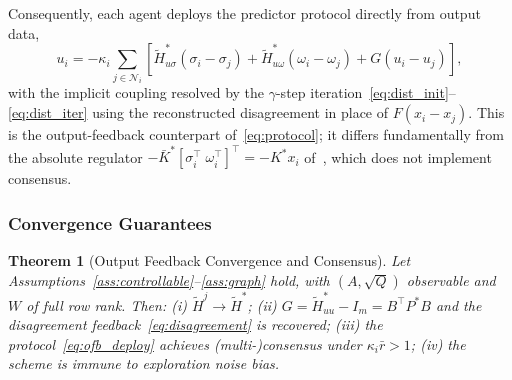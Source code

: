 \documentclass[12pt]{elsarticle}
\newtheorem{theorem}{Theorem}
\theoremstyle{remark}
\begin{document}
Consequently, each agent deploys the predictor protocol directly from output data,
\begin{equation}
u_i = -\kappa_i \sum_{j \in \mathcal{N}_i} \left[ \tilde{H}_{u\sigma}^*(\sigma_i - \sigma_j) + \tilde{H}_{u\omega}^*(\omega_i - \omega_j) + G(u_i - u_j) \right],
\label{eq:ofb_deploy}
\end{equation}
with the implicit coupling resolved by the $\gamma$-step iteration~\eqref{eq:dist_init}--\eqref{eq:dist_iter} using the reconstructed disagreement in place of $F(x_i-x_j)$. This is the output-feedback counterpart of~\eqref{eq:protocol}; it differs fundamentally from the absolute regulator $-\bar{K}^*[\sigma_i^\top\;\omega_i^\top]^\top = -K^*x_i$ of~\cite{rizvi2022}, which does not implement consensus.

\subsubsection{Convergence Guarantees}
\label{subsec:ofb_convergence}

\begin{theorem}[Output Feedback Convergence and Consensus]
\label{thm:ofb_convergence}
Let Assumptions~\ref{ass:controllable}--\ref{ass:graph} hold, with $(A, \sqrt{Q})$ observable and $W$ of full row rank. Then:
(i) $\tilde{H}^j \to \tilde{H}^*$;
(ii) $G = \tilde{H}_{uu}^* - I_m = B^\top P^*B$ and the disagreement feedback~\eqref{eq:disagreement} is recovered;
(iii) the protocol~\eqref{eq:ofb_deploy} achieves (multi-)consensus under $\kappa_i \bar{r} > 1$;
(iv) the scheme is immune to exploration noise bias.
\end{theorem}
\end{document}
